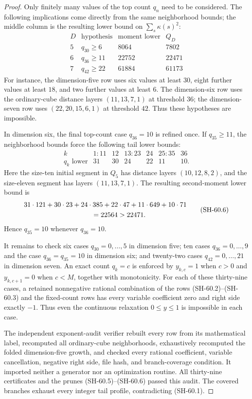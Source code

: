 \begin{proof}
Only finitely many values of the top count $q_n$
need to be considered.  The following implications
come directly from the same neighborhood bounds;
the middle column is the resulting lower bound on
$\sum_s\kappa(s)^2$:
\[
\begin{array}{c|l|r|r}
 D&\text{hypothesis}&\text{moment lower}&Q_D\\\hline
 5&q_{30}\geq6&8064&7802\\
 6&q_{36}\geq11&22752&22471\\
 7&q_{42}\geq22&61884&61173
\end{array}
 \tag{SH-60.5}
\]
For instance, the dimension-five row uses six values
at least $30$, eight further values at least $18$,
and two further values at least $6$.
The dimension-six row uses the ordinary-cube
distance layers $(11,13,7,1)$ at threshold $36$;
the dimension-seven row uses $(22,20,15,6,1)$ at
threshold $42$.  Thus these hypotheses are impossible.

In dimension six, the final top-count case
$q_{36}=10$ is refined once.  If $q_{35}\geq11$,
the neighborhood bounds force the following tail
lower bounds:
\[
\begin{array}{c|rrrrrr}
 k&1\!:\!11&12&13\!:\!23&24&25\!:\!35&36\\\hline
 q_k\text{ lower}&31&30&24&22&11&10.
\end{array}
\]
Here the size-ten initial segment in $Q_5$ has
distance layers $(10,12,8,2)$, and the size-eleven
segment has layers $(11,13,7,1)$.  The resulting
second-moment lower bound is
\[
\begin{split}
 &31\cdot121+30\cdot23+24\cdot385
       +22\cdot47+11\cdot649+10\cdot71\\
 &\hspace{35mm}=22564>22471.
\end{split}
 \tag{SH-60.6}
\]
Hence $q_{35}=10$ whenever $q_{36}=10$.

It remains to check six cases $q_{30}=0,\ldots,5$
in dimension five; ten cases $q_{36}=0,\ldots,9$
and the case $q_{36}=q_{35}=10$ in dimension six;
and twenty-two cases $q_{42}=0,\ldots,21$ in
dimension seven.  An exact count $q_k=c$ is
enforced by $y_{k,c}=1$ when $c>0$ and
$y_{k,c+1}=0$ when $c<M$, together with monotonicity.
For each of these thirty-nine cases, a retained
nonnegative rational combination of the rows
(SH-60.2)--(SH-60.3) and the fixed-count rows has
every variable coefficient zero and right side
exactly $-1$.  Thus even the continuous relaxation
$0\leq y\leq1$ is impossible in each case.

The independent exponent-audit verifier rebuilt every
row from its mathematical label, recomputed all
ordinary-cube neighborhoods, exhaustively recomputed
the folded dimension-five growth, and checked every
rational coefficient, variable cancellation, negative
right side, file hash, and branch-coverage condition.
It imported neither a generator nor an optimization
routine.  All thirty-nine certificates and the
prunes (SH-60.5)--(SH-60.6) passed this audit.
The covered branches exhaust every integer tail
profile, contradicting (SH-60.1).
\end{proof}

